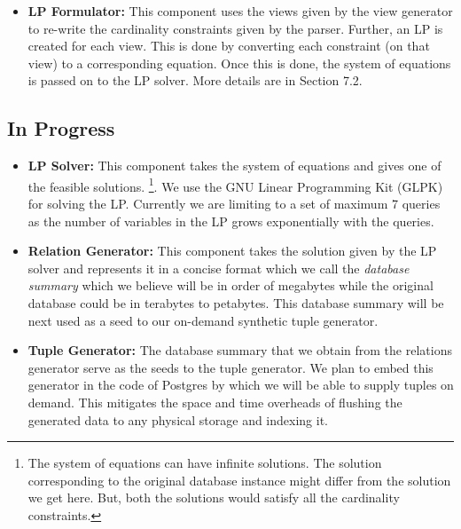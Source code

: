 \documentclass[]{article}
\begin{document}
\begin{multicols}{2}
\begin{itemize}
            \item {\bf LP Formulator:}
            This component uses the views given by the view generator to re-write the cardinality constraints given by the parser.
            Further, an LP is created for each view. This is done by converting each constraint (on that view) to a corresponding equation.
            Once this is done, the system of equations is passed on to the LP solver.
            More details are in Section 7.2.

		\end{itemize}

		\subsection{In Progress}			
		\begin{itemize}
			\item {\bf LP Solver:}
            This component takes the system of equations and gives one of the feasible solutions. 
            \footnote{The system of equations can have infinite solutions.
            The solution corresponding to the original database instance might differ from the solution we get here. But, both the solutions would satisfy all the cardinality constraints.}.
            We use the GNU Linear Programming Kit (GLPK) \cite{glpk} for solving the LP.
            Currently we are limiting to a set of maximum 7 queries as the number of variables in the LP grows exponentially with the queries.

            \item {\bf Relation Generator:}
            This component takes the solution given by the LP solver and represents it in a concise format which we call the \textit{database summary} which we believe will be in order of megabytes while the original database could be in terabytes to petabytes.
        This database summary will be next used as a seed to our on-demand synthetic tuple generator.
            
            \item {\bf Tuple Generator:}
            The database summary that we obtain from the relations generator serve as the seeds to the tuple generator. 
			We plan to embed this generator in the code of Postgres by which we will be able to supply tuples on demand.
			This mitigates the space and time overheads of flushing the generated data to any physical storage and indexing it. 
        \end{itemize}
	

\end{multicols}
\end{document}

